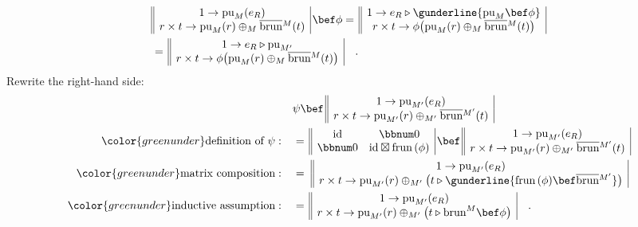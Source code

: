 \begin{align*}
 & \begin{array}{||c|}
1\rightarrow\text{pu}_{M}(e_{R})\\
r\times t\rightarrow\text{pu}_{M}(r)\oplus_{M}\overline{\text{brun}}{}^{M}(t)
\end{array}\,\bef\phi=\,\begin{array}{||c|}
1\rightarrow e_{R}\triangleright\gunderline{\text{pu}_{M}\bef\phi}\\
r\times t\rightarrow\phi\big(\text{pu}_{M}(r)\oplus_{M}\overline{\text{brun}}{}^{M}(t)\big)
\end{array}\\
 & =\,\begin{array}{||c|}
1\rightarrow e_{R}\triangleright\text{pu}_{M^{\prime}}\\
r\times t\rightarrow\phi\big(\text{pu}_{M}(r)\oplus_{M}\overline{\text{brun}}{}^{M}(t)\big)
\end{array}\quad.
\end{align*}
Rewrite the right-hand side:
\begin{align*}
 & \psi\bef\,\begin{array}{||c|}
1\rightarrow\text{pu}_{M^{\prime}}(e_{R})\\
r\times t\rightarrow\text{pu}_{M^{\prime}}(r)\oplus_{M^{\prime}}\overline{\text{brun}}{}^{M^{\prime}}(t)
\end{array}\\
{\color{greenunder}\text{definition of }\psi:}\quad & =\,\begin{array}{||cc|}
\text{id} & \bbnum 0\\
\bbnum 0 & \text{id}\boxtimes\text{frun}\,(\phi)
\end{array}\,\bef\,\begin{array}{||c|}
1\rightarrow\text{pu}_{M^{\prime}}(e_{R})\\
r\times t\rightarrow\text{pu}_{M^{\prime}}(r)\oplus_{M^{\prime}}\overline{\text{brun}}{}^{M^{\prime}}(t)
\end{array}\\
{\color{greenunder}\text{matrix composition}:}\quad & =\,\,\begin{array}{||c|}
1\rightarrow\text{pu}_{M^{\prime}}(e_{R})\\
r\times t\rightarrow\text{pu}_{M^{\prime}}(r)\oplus_{M^{\prime}}\big(t\triangleright\gunderline{\text{frun}\,(\phi)\bef\overline{\text{brun}}{}^{M^{\prime}}}\big)
\end{array}\\
{\color{greenunder}\text{inductive assumption}:}\quad & =\,\begin{array}{||c|}
1\rightarrow\text{pu}_{M^{\prime}}(e_{R})\\
r\times t\rightarrow\text{pu}_{M^{\prime}}(r)\oplus_{M^{\prime}}\big(t\triangleright\text{brun}^{M}\bef\phi\big)
\end{array}\quad.
\end{align*}

